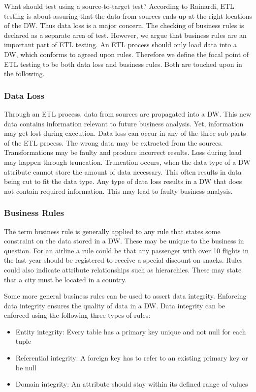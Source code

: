 What should \FW{} test using a source-to-target test? According to Rainardi, ETL testing is about assuring that the data from sources ends up at the right locations of the DW. Thus data loss is a major concern. The checking of business rules is declared as a separate area of test. However, we argue that business rules are an important part of ETL testing. An ETL process should only load data into a DW, which conforms to agreed upon rules. Therefore we define the focal point of ETL testing to be both data loss and business rules. Both are touched upon in the following.

\subsubsection{Data Loss}
Through an ETL process, data from sources are propagated into a DW. This new data contains information relevant to future business analysis. Yet, information may get lost during execution. Data loss can occur in any of the three sub parts of the ETL process. The wrong data may be extracted from the sources. Transformations may be faulty and produce incorrect results. Loss during load may happen through truncation. Truncation occurs, when the data type of a DW attribute cannot store the amount of data necessary. This often results in data being cut to fit the data type. Any type of data loss results in a DW that does not contain required information. This may lead to faulty business analysis.

\subsubsection{Business Rules}
The term business rule is generally applied to any rule that states some constraint on the data stored in a DW. These may be unique to the business in question. For an airline a rule could be that any passenger with over 10 flights in the last year should be registered to receive a special discount on snacks. Rules could also indicate attribute relationships such as hierarchies. These may state that a city must be located in a country.

Some more general business rules can be used to assert data integrity. Enforcing data integrity ensures the quality of data in a DW. Data integrity can be enforced using the following three types of rules:

\begin{itemize}
\item Entity integrity: Every table has a primary key unique and not null for each tuple
\item Referential integrity: A foreign key has to refer to an existing primary key or be null
\item Domain integrity: An attribute should stay within its defined range of values
\end{itemize}

